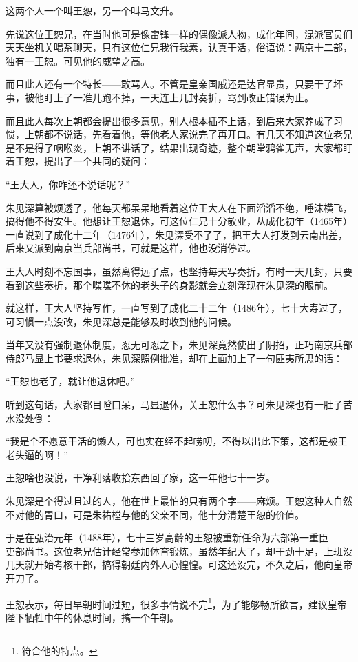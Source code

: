 \begin{multicols}{\theparacolNo}
		这两个人一个叫王恕，另一个叫马文升。

		先说这位王恕兄，在当时他可是像雷锋一样的偶像派人物，成化年间，混派官员们天天坐机关喝茶聊天，只有这位仁兄我行我素，认真干活，俗语说：两京十二部，独有一王恕。可见他的威望之高。

		而且此人还有一个特长——敢骂人。不管是皇亲国戚还是达官显贵，只要干了坏事，被他盯上了一准儿跑不掉，一天连上几封奏折，骂到改正错误为止。

		而且此人每次上朝都会提出很多意见，别人根本插不上话，到后来大家养成了习惯，上朝都不说话，先看着他，等他老人家说完了再开口。有几天不知道这位老兄是不是得了咽喉炎，上朝不讲话了，结果出现奇迹，整个朝堂鸦雀无声，大家都盯着王恕，提出了一个共同的疑问：

		“王大人，你咋还不说话呢？”

		朱见深算被烦透了，他每天都呆呆地看着这位王大人在下面滔滔不绝，唾沫横飞，搞得他不得安生。他想让王恕退休，可这位仁兄十分敬业，从成化初年（1465年）一直说到了成化十二年（1476年），朱见深受不了了，把王大人打发到云南出差，后来又派到南京当兵部尚书，可就是这样，他也没消停过。

		王大人时刻不忘国事，虽然离得远了点，也坚持每天写奏折，有时一天几封，只要看到这些奏折，那个喋喋不休的老头子的身影就会立刻浮现在朱见深的眼前。

		就这样，王大人坚持写作，一直写到了成化二十二年（1486年），七十大寿过了，可习惯一点没改，朱见深总是能够及时收到他的问候。

		当年又没有强制退休制度，忍无可忍之下，朱见深竟然使出了阴招，正巧南京兵部侍郎马显上书要求退休，朱见深照例批准，却在上面加上了一句匪夷所思的话：

		“王恕也老了，就让他退休吧。”

		听到这句话，大家都目瞪口呆，马显退休，关王恕什么事？可朱见深也有一肚子苦水没处倒：

		“我是个不愿意干活的懒人，可也实在经不起唠叨，不得以出此下策，这都是被王老头逼的啊！”

		王恕啥也没说，干净利落收拾东西回了家，这一年他七十一岁。

		朱见深是个得过且过的人，他在世上最怕的只有两个字——麻烦。王恕这种人自然不对他的胃口，可是朱祐樘与他的父亲不同，他十分清楚王恕的价值。

		于是在弘治元年（1488年），七十三岁高龄的王恕被重新任命为六部第一重臣——吏部尚书。这位老兄估计经常参加体育锻炼，虽然年纪大了，却干劲十足，上班没几天就开始考核干部，搞得朝廷内外人心惶惶。可这还没完，不久之后，他向皇帝开刀了。

		王恕表示，每日早朝时间过短，很多事情说不完\footnote{符合他的特点。}，为了能够畅所欲言，建议皇帝陛下牺牲中午的休息时间，搞一个午朝。


\end{multicols}
